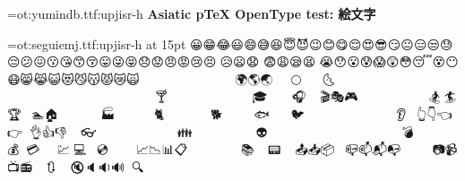 \parindent0pt
\font\hed=ot:yumindb.ttf:upjisr-h\hed
\bf Asiatic {p\TeX} OpenType test: 絵文字\par
\vskip20pt
\font\fnt=ot:seguiemj.ttf:upjisr-h at 15pt\fnt
😀😁😂😃😄😅😆😇😈😉😊😋😌😍😎😏😐😑😒😓😔😕😖😗😘😙😚😛😜😝😞😟😠😡😢😣😤😥😦😧
😨😩😪😫😬😭😯😮😰😱😲😳😴😵😶😷😸😹😺😻😼😽😾😿🙀🙁🙂🙅🙆🙇🙈🙉🙊🙋🙌🙍🙎🙏🌀🌁
🌂🌃🌄🌅🌆🌇🌈🌉🌊🌋🌌🌍🌎🌏🌐🌑🌒🌓🌔🌕🌖🌗🌘🌙🌚🌛🌜🌝🌞🌟🌠🌰🌱🌲🌳🌴🌵🌷🌸🌹
🌺🌻🌼🌽🌾🌿🍀🍁🍂🍃🍄🍅🍆🍇🍈🍉🍊🍋🍌🍍🍎🍏🍐🍑🍒🍓🍔🍕🍖🍗🍘🍙🍚🍛🍜🍝🍞🍟🍠🍡
🍢🍣🍤🍥🍦🍧🍨🍩🍪🍫🍬🍭🍮🍯🍰🍱🍲🍳🍴🍵🍶🍷🍸🍹🍺🍻🍼🎀🎁🎂🎃🎄🎅🎆🎇🎈🎉🎊🎋🎌
🎍🎎🎏🎐🎑🎒🎓🎠🎡🎢🎣🎤🎥🎦🎧🎨🎩🎪🎫🎬🎭🎮🎯🎰🎱🎲🎳🎴🎵🎶🎷🎸🎹🎺🎻🎼🎽🎾🎿🏀
🏁🏂🏃🏄🏆🏇🏈🏉🏊🏠🏡🏢🏣🏤🏥🏦🏧🏨🏩🏪🏫🏬🏭🏮🏯🏰🐀🐁🐂🐃🐄🐅🐆🐇🐈🐉🐊🐋🐌🐍
🐎🐏🐐🐑🐒🐓🐔🐕🐖🐗🐘🐙🐚🐛🐜🐝🐞🐟🐠🐡🐢🐣🐤🐥🐦🐧🐨🐩🐪🐫🐬🐭🐮🐯🐰🐱🐲🐳🐴🐵
🐶🐷🐸🐹🐺🐻🐼🐽🐾👀👂👃👄👅👆👇👈👉👊👋👌👍👎👏👐👑👒👓👔👕👖👗👘👙👚👛👜👝👞👟
👠👡👢👣👤👥👦👧👨👩👪👫👬👭👮👯👰👱👲👳👴👵👶👷👸👹👺👻👼👽👾👿💀💁💂💃💄💅💆💇
💈💉💊💋💌💍💎💏💐💑💒💓💔💕💖💗💘💙💚💛💜💝💞💟💠💡💢💣💤💥💦💧💨💩💪💫💬💭💮💯
💰💱💲💳💴💵💶💷💸💹💺💻💼💽💾💿📀📁📂📃📄📅📆📇📈📉📊📋📌📍📎📏📐📑📒📓📔📕📖📗
📘📙📚📛📜📝📞📟📠📡📢📣📤📥📦📧📨📩📪📫📬📭📮📯📰📱📲📳📴📵📶📷📹📺📻📼🔀🔁🔂🔃
🔄🔅🔆🔇🔈🔉🔊🔋🔌🔍🔎🔏
\bye
